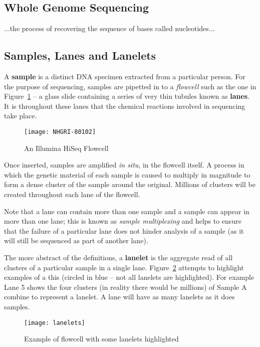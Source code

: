 \subsection{Whole Genome Sequencing}
...the process of recovering the sequence of bases called nucleotides...

\subsection{Samples, Lanes and Lanelets}
\label{chap:samplelanelanelets}

A \textbf{sample} is a distinct DNA specimen extracted from a particular person.
For the purpose of sequencing, samples are pipetted in to a \textit{flowcell}
such as the one in Figure~\ref{fig:flowcell} -- a glass slide
containing a series of very thin tubules known as \textbf{lanes}.  It is
throughout these lanes that the chemical reactions involved in sequencing take place.

\begin{figure}[htbp!]
    \centering
    \texttt{[image: NHGRI-80102]}
    \caption[flowcell]{An Illumina HiSeq Flowcell\citep{img:flowcell}}
    \label{fig:flowcell}
\end{figure}

Once inserted, samples are amplified \textit{in situ}, in the flowcell itself. A
process in which the genetic material of each sample is caused to multiply in
magnitude to form a dense cluster of the sample around the original. Millions of
clusters will be created throughout each lane of the flowcell.

Note that a lane can contain more than one sample and a sample can appear in
more than one lane; this is known as \textit{sample multiplexing} and helps to
ensure that the failure of a particular lane does not hinder analysis of a
sample (as it will still be sequenced as part of another lane).

The more abstract of the definitions, a \textbf{lanelet} is the aggregate read
of all clusters of a particular sample in a single lane.
Figure~\ref{fig:lanelets} attempts to highlight examples of a this (circled in
blue -- not all lanelets are highlighted). For example Lane 5 shows the four
clusters (in reality there would be millions) of Sample A combine to
represent a lanelet. A lane will have as many lanelets as it does samples.

\begin{figure}[htbp!]
    \centering
    \texttt{[image: lanelets]}
    \caption[lanelets]{Example of flowcell with some lanelets highlighted}
    \label{fig:lanelets}
\end{figure}


